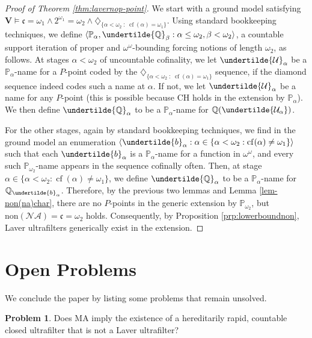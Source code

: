 \documentclass[12pt]{article}
\theoremstyle{definition}
\newtheorem{problem}{\sc Problem}
\begin{document}
\begin{proof}[Proof of Theorem \ref{thm:lavernop-point}]
We start with a ground model satisfying $\mathbf{V}\vDash \mathfrak{c}=\omega_1 \land 2^{\omega_1}=\omega_2 \land \diamondsuit_{\{\alpha<\omega_2\; :\; \operatorname{cf}(\alpha)=\omega_1\}}$. Using standard bookkeeping techniques, we define $\langle \mathbb{P}_{\alpha}, \undertilde{\mathbb{Q}}_{\beta} : \alpha\leq\omega_2, \beta<\omega_2\rangle$, a countable support iteration of proper and $\omega^\omega$-bounding forcing notions of length $\omega_2$, as follows. At stages $\alpha<\omega_2$ of uncountable cofinality, we let $\undertilde{\mathcal{U}}_{\alpha}$ be a $\mathbb{P}_{\alpha}$-name for a $P$-point coded by the $\diamondsuit_{\{\alpha<\omega_2\; :\; \operatorname{cf}(\alpha)=\omega_1\}}$ sequence, if the diamond sequence indeed codes such a name at $\alpha$. If not, we let $\undertilde{\mathcal{U}}_{\alpha}$ be a name for any $P$-point (this is possible because \textsf{CH} holds in the extension by $\mathbb{P}_{\alpha}$). We then define $\undertilde{\mathbb{Q}}_{\alpha}$ to be a $\mathbb{P}_{\alpha}$-name for $\mathbb{Q}(\undertilde{\mathcal{U}_{\alpha}})$.

For the other stages, again by standard bookkeeping techniques, we find in the ground model an enumeration $\langle \undertilde{b}_{\alpha} : \alpha\in\{\alpha<\omega_2 : \operatorname{cf}(\alpha)\neq\omega_1\}\rangle$ such that each $\undertilde{b}_{\alpha}$ is a $\mathbb{P}_{\alpha}$-name for a function in $\omega^\omega$, and every such $\mathbb{P}_{\omega_2}$-name appears in the sequence cofinally often. Then, at stage $\alpha\in\{\alpha<\omega_2 : \operatorname{cf}(\alpha)\neq\omega_1\}$, we define $\undertilde{\mathbb{Q}}_{\alpha}$ to be a $\mathbb{P}_{\alpha}$-name for $\mathbb{Q}_{\undertilde{b}_{\alpha}}$. Therefore, by the previous two lemmas and Lemma \ref{lem-non(na)char}, there are no $P$-points in the generic extension by $\mathbb{P}_{\omega_2}$, but $\text{non}(\mathcal{NA})=\mathfrak{c}=\omega_2$ holds. Consequently, by Proposition \ref{prp:lowerboundnon}, Laver ultrafilters generically exist in the extension.
\end{proof}

\section*{Open Problems}

We conclude the paper by listing some problems that remain unsolved.

\begin{problem}
Does \textsf{MA} imply the existence of a hereditarily rapid, countable closed ultrafilter that is not a Laver ultrafilter?
\end{problem}
\end{document}
